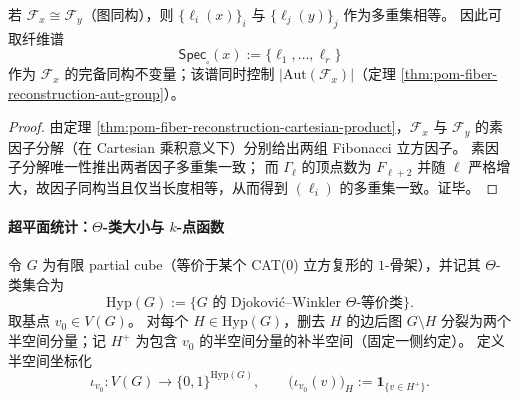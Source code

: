 \begin{corollary}[分量长度多重集为完备同构不变量]\label{cor:pom-fiber-reconstruction-spectrum-complete}
若 \(\mathcal F_x\cong \mathcal F_y\)（图同构），则
\(
\{\ell_i(x)\}_i
\)
与
\(
\{\ell_j(y)\}_j
\)
作为多重集相等。
因此可取纤维谱
\[
\mathsf{Spec}_{\square}(x):=\{\ell_1,\dots,\ell_r\}
\]
作为 \(\mathcal F_x\) 的完备同构不变量；该谱同时控制 \(|\mathrm{Aut}(\mathcal F_x)|\)（定理 \ref{thm:pom-fiber-reconstruction-aut-group}）。
\end{corollary}
\begin{proof}
由定理 \ref{thm:pom-fiber-reconstruction-cartesian-product}，\(\mathcal F_x\) 与 \(\mathcal F_y\) 的素因子分解（在 Cartesian 乘积意义下）分别给出两组 Fibonacci 立方因子。
素因子分解唯一性推出两者因子多重集一致；
而 \(\Gamma_\ell\) 的顶点数为 \(F_{\ell+2}\) 并随 \(\ell\) 严格增大，故因子同构当且仅当长度相等，从而得到 \((\ell_i)\) 的多重集一致。证毕。
\end{proof}

\paragraph{超平面统计：\(\Theta\)-类大小与 \(k\)-点函数}

\begin{definition}\label{def:pom-theta-halfspace-coordinates}
令 \(G\) 为有限 partial cube（等价于某个 CAT(0) 立方复形的 \(1\)-骨架），并记其 \(\Theta\)-类集合为
\[
\mathrm{Hyp}(G):=\{\text{\(G\) 的 Djokovi\'c--Winkler \(\Theta\)-等价类}\}.
\]
取基点 \(v_0\in V(G)\)。
对每个 \(H\in\mathrm{Hyp}(G)\)，删去 \(H\) 的边后图 \(G\setminus H\) 分裂为两个半空间分量；记 \(H^+\) 为包含 \(v_0\) 的半空间分量的补半空间（固定一侧约定）。
定义半空间坐标化
\[
\iota_{v_0}:V(G)\to\{0,1\}^{\mathrm{Hyp}(G)},\qquad
\bigl(\iota_{v_0}(v)\bigr)_H:=\mathbf 1_{\{v\in H^+\}}.
\]
\end{definition}

